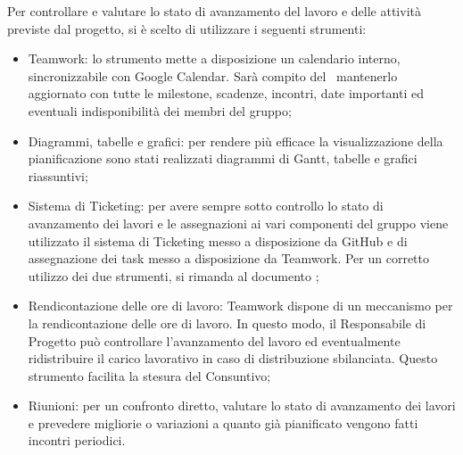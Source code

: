 \documentclass[../PianoProgetto.tex]{subfiles}
\begin{document}
Per controllare e valutare lo stato di avanzamento del lavoro e delle attività previste dal progetto, si è scelto di utilizzare i seguenti strumenti:
	\begin{itemize}
	\item Teamwork: lo strumento mette a disposizione un calendario interno, sincronizzabile con Google Calendar. Sarà compito del \responsabilediprogetto\ mantenerlo aggiornato con tutte le milestone, scadenze, incontri, date importanti ed eventuali indisponibilità dei membri del gruppo;
	\item Diagrammi, tabelle e grafici: per rendere più efficace la visualizzazione della pianificazione sono stati realizzati diagrammi di Gantt, tabelle e grafici riassuntivi;
	\item Sistema di Ticketing: per avere sempre sotto controllo lo stato di avanzamento dei lavori e le assegnazioni ai vari componenti del gruppo viene utilizzato il sistema di Ticketing messo a disposizione da GitHub e di assegnazione dei task messo a disposizione da Teamwork. Per un corretto utilizzo dei due strumenti, si rimanda al documento \normediprogetto ;
	\item Rendicontazione delle ore di lavoro: Teamwork dispone di un meccanismo per la rendicontazione delle ore di lavoro. In questo modo, il Responsabile di Progetto può controllare l’avanzamento del lavoro ed eventualmente ridistribuire il carico lavorativo in caso di distribuzione sbilanciata. Questo strumento facilita la stesura del Consuntivo;
	\item Riunioni: per un confronto diretto, valutare lo stato di avanzamento dei lavori e prevedere migliorie o variazioni a quanto già pianificato vengono fatti incontri periodici.
	\end{itemize}
	
\end{document}
